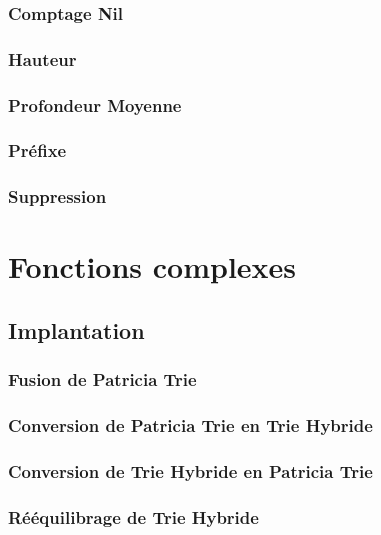 \documentclass[a4paper,12pt]{report}
\begin{document}
\subsection{Comptage Nil}

\subsection{Hauteur}

\subsection{Profondeur Moyenne}

\subsection{Préfixe}

\subsection{Suppression}

\chapter{Fonctions complexes}
\section{Implantation}
\subsection{Fusion de Patricia Trie}

\subsection{Conversion de Patricia Trie en Trie Hybride}

\subsection{Conversion de Trie Hybride en Patricia Trie}

\subsection{Rééquilibrage de Trie Hybride}
\end{document}
